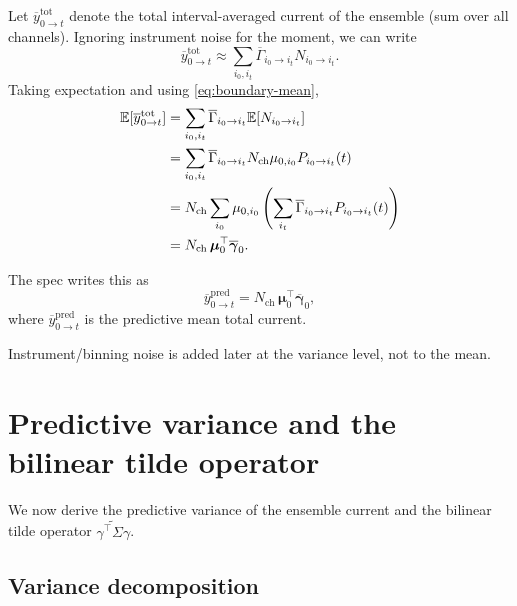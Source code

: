 \documentclass[11pt]{article}
\begin{document}
Let \(\overline{y}^{\text{tot}}_{0\to t}\) denote the total interval-averaged
current of the ensemble (sum over all channels). Ignoring instrument noise for
the moment, we can write
\[
  \overline{y}^{\text{tot}}_{0\to t}
  \approx
  \sum_{i_0,i_t}
  \overline{\Gamma}_{i_0\to i_t} N_{i_0\to i_t}.
\]
Taking expectation and using \eqref{eq:boundary-mean},
\begin{align}
  \mathbb{E}[\overline{y}^{\text{tot}}_{0\to t}]
  &=
  \sum_{i_0,i_t}
  \overline{\Gamma}_{i_0\to i_t}
  \mathbb{E}[N_{i_0\to i_t}]
  \nonumber\\
  &=
  \sum_{i_0,i_t}
  \overline{\Gamma}_{i_0\to i_t}
  N_{\text{ch}}\mu_{0,i_0} P_{i_0\to i_t}(t)
  \nonumber\\
  &=
  N_{\text{ch}}
  \sum_{i_0}
  \mu_{0,i_0}
  \left(
    \sum_{i_t}
    \overline{\Gamma}_{i_0\to i_t}
    P_{i_0\to i_t}(t)
  \right)
  \nonumber\\
  &=
  N_{\text{ch}}\,
  \boldsymbol{\mu}_0^\top \overline{\boldsymbol{\gamma}}_0.
\end{align}

The spec writes this as
\[
  \boxed{
    \overline{y}^{\text{pred}}_{0\to t}
    =
    N_{\text{ch}}\,
    \boldsymbol{\mu}_0^\top \overline{\boldsymbol{\gamma}}_0,
  }
\]
where
\(\overline{y}^{\text{pred}}_{0\to t}\) is the predictive mean total current.

Instrument/binning noise is added later at the variance level, not to the mean.


\section{Predictive variance and the bilinear tilde operator}

We now derive the predictive variance of the ensemble current and the bilinear
tilde operator
\(\widetilde{\gamma^\top\Sigma\gamma}\).

\subsection{Variance decomposition}
\end{document}
